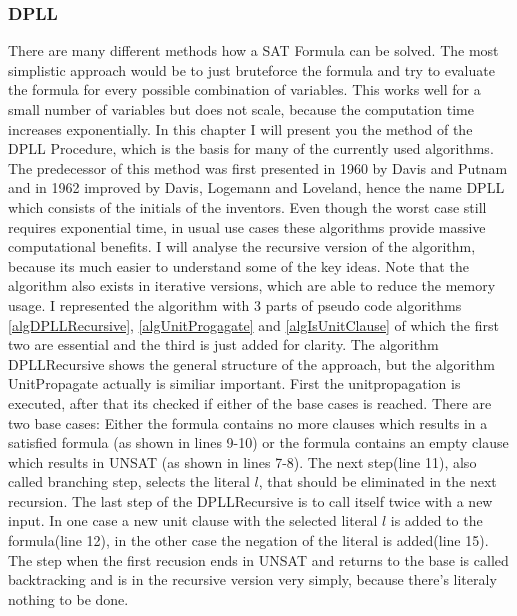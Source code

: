\subsubsection{DPLL}
There are many different methods how a SAT Formula can be solved. The most simplistic approach would be to just bruteforce the formula and try to evaluate the formula for every possible combination of variables. This works well for a small number of variables but does not scale, because the computation time increases exponentially. In this chapter I will present you the method of the DPLL Procedure, which is the basis for many of the currently used algorithms.
The predecessor of this method was first presented in 1960 by Davis and Putnam and in 1962 improved by Davis, Logemann and Loveland, hence the name DPLL which consists of the initials of the inventors.
Even though the worst case still requires exponential time, in usual use cases these algorithms provide massive computational benefits. I will analyse the recursive version of the algorithm, because its much easier to understand some of the key ideas. Note that the algorithm also exists in iterative versions, which are able to reduce the memory usage.
I represented the algorithm with 3 parts of pseudo code algorithms \ref{algDPLLRecursive}, \ref{algUnitProgagate} and \ref{algIsUnitClause} of which the first two are essential and the third is just added for clarity.
The algorithm DPLLRecursive shows the general structure of the approach, but the algorithm UnitPropagate actually is similiar important.
First the unitpropagation is executed, after that its checked if either of the base cases is reached. There are two base cases: Either the formula contains no more clauses which results in a satisfied formula (as shown in lines 9-10) or the formula contains an empty clause which results in UNSAT (as shown in lines 7-8).
The next step(line 11), also called branching step, selects the literal $l$, that should be eliminated in the next recursion.
The last step of the DPLLRecursive is to call itself twice with a new input. In one case a new unit clause with the selected literal $l$ is added to the formula(line 12), in the other case the negation of the literal is added(line 15).
The step when the first recusion ends in UNSAT and returns to the base is called backtracking and is in the recursive version very simply, because there's literaly nothing to be done.\\

